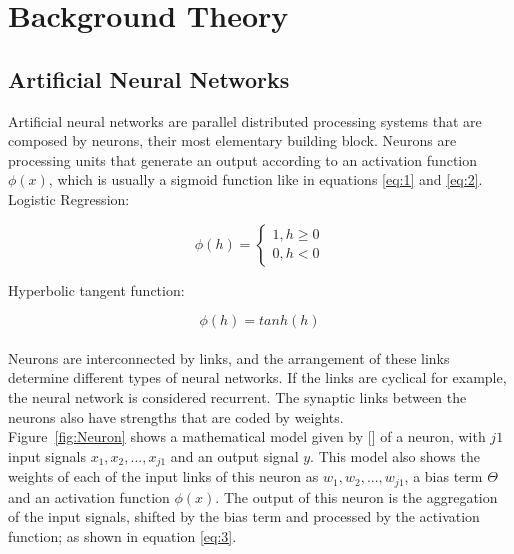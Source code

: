 
\chapter{Background Theory} %

\label{Chapter1} %


\newcommand{\keyword}[1]{\textbf{#1}}
\newcommand{\tabhead}[1]{\textbf{#1}}
\newcommand{\code}[1]{\texttt{#1}}
\newcommand{\file}[1]{\texttt{\bfseries#1}}
\newcommand{\option}[1]{\texttt{\itshape#1}}


\section{Artificial Neural Networks}
Artificial neural networks are parallel distributed processing systems that are composed by  neurons, their most elementary building block. Neurons are processing  units that generate an output according to an activation function $\phi(x)$, which is usually a sigmoid function like in equations \ref{eq:1} and \ref{eq:2}.\\

Logistic Regression: 

\begin{equation}\label{eq:1}
\phi(h)= \left\{
			 \begin{array}{ll}
			 	1, h\geq0\\
			 	0, h<0
			\end{array}
		 \right.
\end{equation}


Hyperbolic tangent function:

\begin{equation}\label{eq:2}
\phi(h)=tanh(h)
\end{equation}
\\

Neurons are interconnected by links, and the arrangement of these links determine different types of neural networks. If the links are cyclical for example, the neural network is considered recurrent. The synaptic links between the neurons also have strengths that are coded by weights. 
\\
Figure~\ref{fig:Neuron} shows a mathematical model given by [\cite{Reference2}] of a neuron, with $j1$ input signals $x_1, x_2, ..., x_{j1}$ and an output signal $y$. This model also shows the weights of each of the input links of this neuron as $w_1, w_2,...,w_{j1} $, a bias term $\Theta$ and an activation function $\phi(x)$. The output of this neuron is the aggregation of the input signals, shifted by the bias term and processed by the activation function; as shown in equation \ref{eq:3}.


